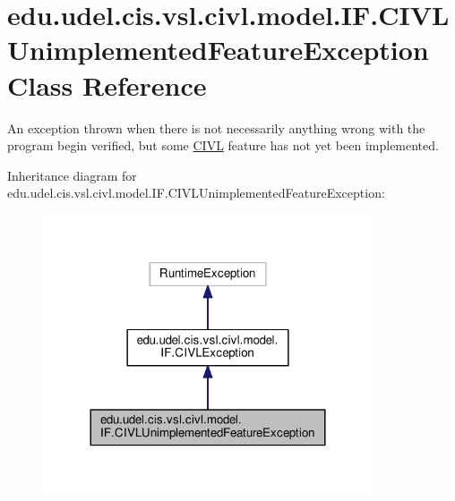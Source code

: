 \hypertarget{classedu_1_1udel_1_1cis_1_1vsl_1_1civl_1_1model_1_1IF_1_1CIVLUnimplementedFeatureException}{}\section{edu.\+udel.\+cis.\+vsl.\+civl.\+model.\+I\+F.\+C\+I\+V\+L\+Unimplemented\+Feature\+Exception Class Reference}
\label{classedu_1_1udel_1_1cis_1_1vsl_1_1civl_1_1model_1_1IF_1_1CIVLUnimplementedFeatureException}


An exception thrown when there is not necessarily anything wrong with the program begin verified, but some \hyperlink{classedu_1_1udel_1_1cis_1_1vsl_1_1civl_1_1CIVL}{C\+I\+V\+L} feature has not yet been implemented.  




Inheritance diagram for edu.\+udel.\+cis.\+vsl.\+civl.\+model.\+I\+F.\+C\+I\+V\+L\+Unimplemented\+Feature\+Exception\+:
\nopagebreak
\begin{figure}[H]
\begin{center}
\leavevmode
\includegraphics[width=276pt]{classedu_1_1udel_1_1cis_1_1vsl_1_1civl_1_1model_1_1IF_1_1CIVLUnimplementedFeatureException__inherit__graph}
\end{center}
\end{figure}


